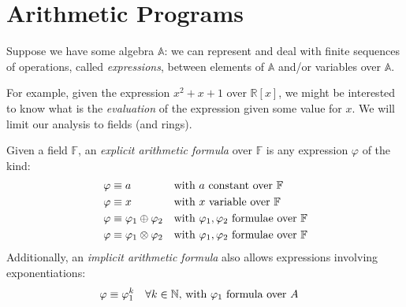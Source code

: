 \section{Arithmetic Programs}
Suppose we have some algebra \(\mathbb{A}\): we can represent and deal with finite sequences of 
operations, called \emph{expressions}, between elements of \(\mathbb{A}\) and/or variables over 
\(\mathbb{A}\).

For example, given the expression \(x^2 + x + 1\) over \(\mathbb{R}\left[x\right]\), we might be 
interested to know what is the \emph{evaluation} of the expression given some value for \(x\).
We will limit our analysis to fields (and rings).
\begin{definition}
  Given a field \(\mathbb{F}\), an \emph{explicit arithmetic formula} over \(\mathbb{F}\) is any 
  expression \(\varphi \) of the kind:
  \begin{align*}
    & \varphi \equiv a && \textnormal{with \(a\) constant over \(\mathbb{F}\)} \\ 
    & \varphi \equiv x && \textnormal{with \(x\) variable over \(\mathbb{F}\)} \\
    & \varphi \equiv \varphi_1 \oplus \varphi_2 && 
    \textnormal{with \(\varphi_1, \varphi_2\) formulae over \(\mathbb{F}\)} \\
    & \varphi \equiv \varphi_1 \otimes \varphi_2 && 
    \textnormal{with \(\varphi_1, \varphi_2\) formulae over \(\mathbb{F}\)}
  \end{align*}
  Additionally, an \emph{implicit arithmetic formula} also allows expressions involving 
  exponentiations:
  \begin{align*}
    & \varphi \equiv \varphi_{1}^{k} && 
    \textnormal{\(\forall k \in \mathbb{N}\), with \(\varphi_1\) formula over \(A\)}
  \end{align*}
\end{definition}

